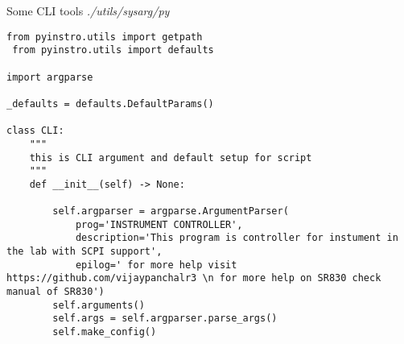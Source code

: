 Some CLI tools \emph{./utils/sysarg/py}
\begin{verbatim}
from pyinstro.utils import getpath
 from pyinstro.utils import defaults

import argparse

_defaults = defaults.DefaultParams()

class CLI:
    """
    this is CLI argument and default setup for script
    """
    def __init__(self) -> None:

        self.argparser = argparse.ArgumentParser(
            prog='INSTRUMENT CONTROLLER',
            description='This program is controller for instument in the lab with SCPI support',
            epilog=' for more help visit https://github.com/vijaypanchalr3 \n for more help on SR830 check manual of SR830')
        self.arguments()
        self.args = self.argparser.parse_args()
        self.make_config()
        

\end{verbatim}
